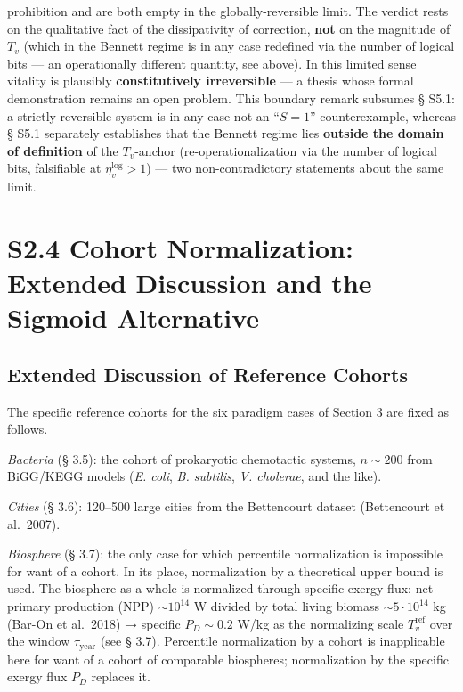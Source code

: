 \documentclass[pdflatex,sn-mathphys-ay]{sn-jnl}
\begin{document}
prohibition and are both empty in the globally-reversible limit. The verdict rests on the qualitative fact of the dissipativity of correction, \textbf{not} on the magnitude of \(T_v\) (which in the Bennett regime is in any case redefined via the number of logical bits --- an operationally different quantity, see above). In this limited sense vitality is plausibly \textbf{constitutively irreversible} --- a thesis whose formal demonstration remains an open problem. This boundary remark subsumes § S5.1: a strictly reversible system is in any case not an ``\(S = 1\)'' counterexample, whereas § S5.1 separately establishes that the Bennett regime lies \textbf{outside the domain of definition} of the \(T_v\)-anchor (re-operationalization via the number of logical bits, falsifiable at \(\eta_v^{\text{log}} > 1\)) --- two non-contradictory statements about the same limit.

\section*{S2.4 Cohort Normalization: Extended Discussion and the Sigmoid Alternative}\label{s2.4-cohort-normalization-extended-discussion-and-the-sigmoid-alternative}

\subsection*{Extended Discussion of Reference Cohorts}\label{extended-discussion-of-reference-cohorts}

The specific reference cohorts for the six paradigm cases of Section 3 are fixed as follows.

\emph{Bacteria} (§ 3.5): the cohort of prokaryotic chemotactic systems, \(n \sim 200\) from BiGG/KEGG models (\emph{E. coli}, \emph{B. subtilis}, \emph{V. cholerae}, and the like).

\emph{Cities} (§ 3.6): 120--500 large cities from the Bettencourt dataset (Bettencourt et al.~2007).

\emph{Biosphere} (§ 3.7): the only case for which percentile normalization is impossible for want of a cohort. In its place, normalization by a theoretical upper bound is used. The biosphere-as-a-whole is normalized through specific exergy flux: net primary production (NPP) \(\sim 10^{14}\) W divided by total living biomass \(\sim 5 \cdot 10^{14}\) kg (Bar-On et al.~2018) → specific \(P_D \sim 0.2\) W/kg as the normalizing scale \(T_v^{\text{ref}}\) over the window \(\tau_{\text{year}}\) (see § 3.7). Percentile normalization by a cohort is inapplicable here for want of a cohort of comparable biospheres; normalization by the specific exergy flux \(P_D\) replaces it.
\end{document}

